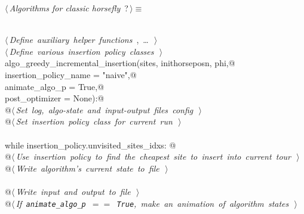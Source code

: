 \documentclass[11.5pt]{report}
\begin{document}
\begin{flushleft} \small\label{scrap22}\raggedright\small
{} $\langle\,${\itshape Algorithms for classic horsefly}\nobreak\ {\footnotesize {?}}$\,\rangle\equiv$
\vspace{-1ex}
\begin{list}{}{} \item
\mbox{}\verb@@\\
\mbox{}\verb@@\hbox{$\langle\,${\itshape Define auxiliary helper functions}\nobreak\ {\footnotesize {}, \ldots\ }$\,\rangle$}\verb@@\\
\mbox{}\verb@@\hbox{$\langle\,${\itshape Define various insertion policy classes}\nobreak\ {\footnotesize {}}$\,\rangle$}\verb@@\\
\mbox{}\verb@def algo_greedy_incremental_insertion(sites, inithorseposn, phi,@\\
\mbox{}\verb@                                      insertion_policy_name = "naive",@\\
\mbox{}\verb@                                      animate_algo_p        = True,@\\
\mbox{}\verb@                                      post_optimizer        = None):@\\
\mbox{}\verb@      @\hbox{$\langle\,${\itshape Set log, algo-state and input-output files config}\nobreak\ {\footnotesize {}}$\,\rangle$}\verb@@\\
\mbox{}\verb@      @\hbox{$\langle\,${\itshape Set insertion policy class for current run}\nobreak\ {\footnotesize {}}$\,\rangle$}\verb@@\\
\mbox{}\verb@@\\
\mbox{}\verb@      while insertion_policy.unvisited_sites_idxs: @\\
\mbox{}\verb@         @\hbox{$\langle\,${\itshape Use insertion policy to find the cheapest site to insert into current tour}\nobreak\ {\footnotesize {}}$\,\rangle$}\verb@@\\
\mbox{}\verb@         @\hbox{$\langle\,${\itshape Write algorithm's current state to file}\nobreak\ {\footnotesize {}}$\,\rangle$}\verb@@\\
\mbox{}\verb@@\\
\mbox{}\verb@      @\hbox{$\langle\,${\itshape Write input and output to file}\nobreak\ {\footnotesize {}}$\,\rangle$}\verb@@\\
\mbox{}\verb@      @\hbox{$\langle\,${\itshape If \verb|animate_algo_p| $==$ \verb|True|, make an animation of algorithm states}\nobreak\ {\footnotesize {}}$\,\rangle$}\verb@@\\

\end{list}
\end{flushleft}
\end{document}
